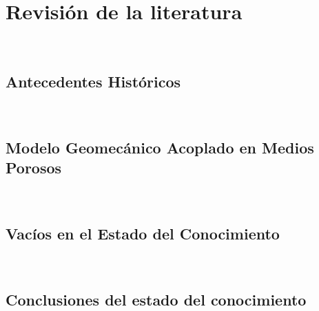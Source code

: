 %





\chapter{Revisión de la literatura}~\hypertarget{ch:chapter_02}{}
\label{ch:chapter_02}

\lipsum[1-2]

\bigskip



\section{Antecedentes Históricos}~\hypertarget{sec:sec210}{}
\label{sec:sec210}




\section{Modelo Geomecánico Acoplado en Medios Porosos}~\hypertarget{sec:sec220}{}
\label{sec:sec220}




\section{Vacíos en el Estado del Conocimiento}~\hypertarget{sec:sec230}{}
\label{sec:sec230}






\section{Conclusiones del estado del conocimiento}~\hypertarget{sec:sec240}{}
\label{sec:sec240}


\bigskip

